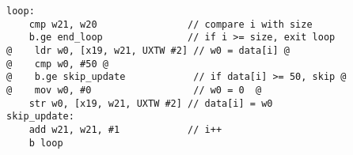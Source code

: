 \begin{lstlisting}[style=AsmStyle]
loop:
    cmp w21, w20                // compare i with size
    b.ge end_loop               // if i >= size, exit loop
@    ldr w0, [x19, w21, UXTW #2] // w0 = data[i] @
@    cmp w0, #50 @
@    b.ge skip_update            // if data[i] >= 50, skip @
@    mov w0, #0                  // w0 = 0  @
    str w0, [x19, w21, UXTW #2] // data[i] = w0
skip_update:
    add w21, w21, #1            // i++
    b loop
\end{lstlisting}